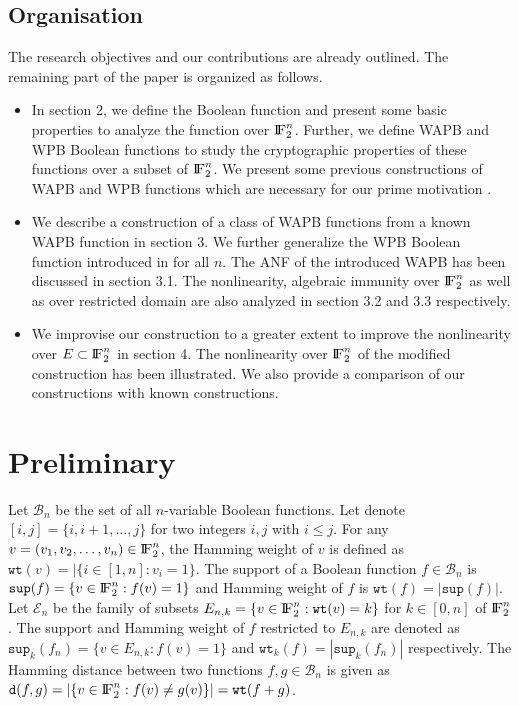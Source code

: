 \documentclass{article}[12pt]
\newcommand{\FF}{{\rm I\!F}}
\newcommand{\CB}{\mathcal{B}}
\newcommand{\CE}{\mathcal{E}}
\newcommand{\wt}{\mathtt{wt}}
\newcommand{\spt}{\mathtt{sup}}
\newcommand{\ds}{\mathtt{d}}
\begin{document}
\subsection{Organisation}\label{ssec:org}
The research objectives and our contributions are already outlined. The remaining part of the paper is organized as follows.
\begin{itemize}
	\item In section 2, we define the Boolean function and present some basic properties to analyze the function over $\FF_2^n$. Further, we define WAPB and WPB Boolean functions to study the cryptographic properties of these functions over a subset of $\FF_2^n$. We present some previous constructions of WAPB and WPB functions which are necessary for our prime motivation .
	\item We describe a construction of a class of WAPB functions from a known WAPB function in section 3. We further generalize the WPB Boolean function introduced in \cite{MS21} for all $n$. The ANF of the introduced WAPB has been discussed in section 3.1. The nonlinearity, algebraic immunity over $\FF_2^n$ as well as over restricted domain are also analyzed in section 3.2 and 3.3 respectively.
	\item We improvise our construction to a greater extent to improve the nonlinearity over $E \subset \FF_2^n$ in section 4. The  nonlinearity over $\FF_2^n$ of the modified construction has been illustrated. We also provide a comparison of our constructions with  known constructions.      
	    
\end{itemize}
 

\section{Preliminary}\label{sec:prel}
Let $\CB_n$ be the set of all $n$-variable Boolean functions. Let denote $[i,j] = \{i, i+1, \ldots, j\}$ for two integers $i,j$ with $i \leq j$.
For any $v = (v_1, v_2, \ldots, v_n) \in \FF_2^n$, the Hamming weight of $v$ is defined as $\wt(v) = |\{i \in [1,n] : v_i = 1\}$. 
The support of a Boolean function $f \in \CB_n$ is $\spt(f)= \{v \in \FF_2^n : f(v) = 1\}$ and Hamming weight of $f$ is $\wt(f) = |\spt(f)|$.
Let $\CE_n$ be the family of subsets $E_{n,k} = \{v \in \FF_2^n : \wt(v) = k\}$ for $k \in [0,n]$ of $\FF_2^n$. 
The support and Hamming weight of $f$ restricted to $E_{n,k}$ are denoted as $\spt_k(f_n)= \{v \in E_{n,k} : f(v) = 1\}$ and $\wt_k(f) = |\spt_k(f_n)|$ respectively.
The Hamming distance between two functions $f, g \in \CB_n$ is given as $\ds(f,g)= |\{v \in \FF_2^n : f(v) \neq g(v)\}| = \wt(f+g)$.
\end{document}
